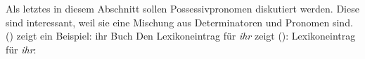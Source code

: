 Als letztes in diesem Abschnitt sollen Possessivpronomen diskutiert werden. Diese sind interessant,
weil sie eine Mischung aus Determinatoren und Pronomen sind. () zeigt ein Beispiel:
\ea
ihr Buch
\z
Den Lexikoneintrag für \emph{ihr} zeigt ():
\eas
Lexikoneintrag für \emph{ihr}:\\
